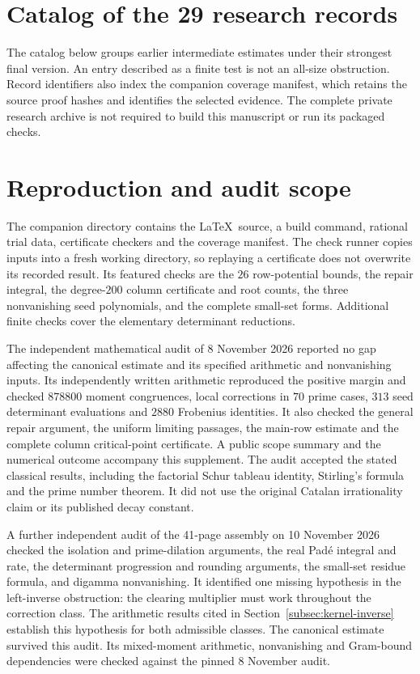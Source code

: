 \section{Catalog of the 29 research records}\label{app:catalog}

The catalog below groups earlier intermediate estimates under their
strongest final version. An entry described as a finite test is not
an all-size obstruction. Record identifiers also index the companion
coverage manifest, which retains the source proof hashes and identifies
the selected evidence. The complete private research archive is not
required to build this manuscript or run its packaged checks.



\section{Reproduction and audit scope}\label{app:audit}

The companion directory contains the \LaTeX\ source, a build command,
rational trial data, certificate checkers and the coverage manifest.
The check runner copies inputs into a fresh working directory, so
replaying a certificate does not overwrite its recorded result.
Its featured checks are the $26$ row-potential bounds, the repair
integral, the degree-$200$ column certificate and root counts, the
three nonvanishing seed polynomials, and the complete small-set forms.
Additional finite checks cover the elementary determinant reductions.

The independent mathematical audit of 8 November 2026 reported no gap
affecting the canonical estimate and its specified arithmetic and
nonvanishing inputs. Its independently written arithmetic reproduced
the positive margin and checked $878800$ moment congruences, local
corrections in $70$ prime cases, $313$ seed determinant evaluations
and $2880$ Frobenius identities. It also checked the general repair
argument, the uniform limiting passages, the main-row estimate and
the complete column critical-point certificate. A public scope summary
and the numerical outcome accompany this supplement. The audit accepted
the stated classical results, including the factorial Schur tableau
identity, Stirling's formula and the prime number theorem. It did not use
the original Catalan irrationality claim or its published decay constant.

A further independent audit of the 41-page assembly on 10 November 2026
checked the isolation and prime-dilation arguments, the real Pad\'e
integral and rate, the determinant progression and rounding arguments,
the small-set residue formula, and digamma nonvanishing. It identified
one missing hypothesis in the left-inverse obstruction: the clearing
multiplier must work throughout the correction class. The arithmetic
results cited in Section~\ref{subsec:kernel-inverse} establish this
hypothesis for both admissible classes. The canonical estimate survived
this audit. Its mixed-moment arithmetic, nonvanishing and Gram-bound
dependencies were checked against the pinned 8 November audit.

